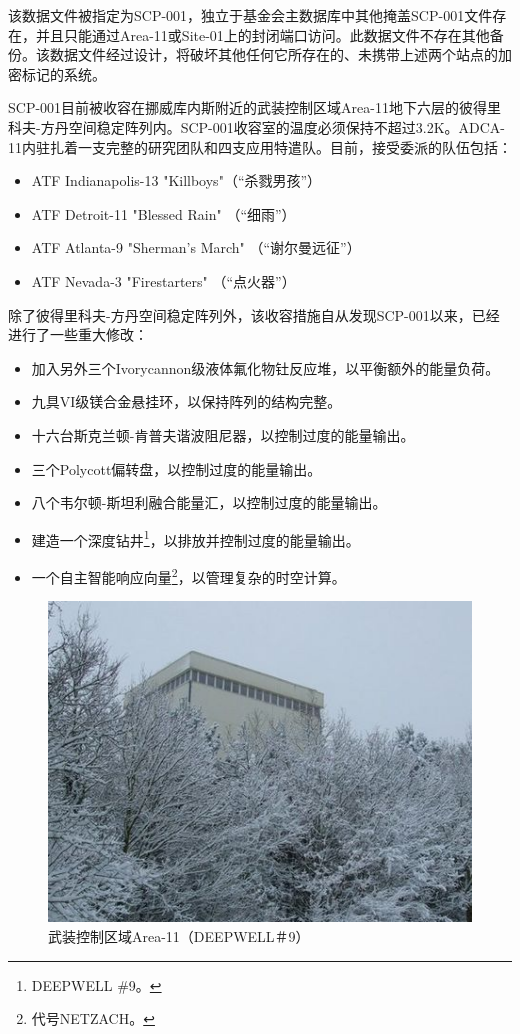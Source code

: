 \hr

该数据文件被指定为SCP-001，独立于基金会主数据库中其他掩盖SCP-001文件存在，并且只能通过Area-11或Site-01上的封闭端口访问。此数据文件不存在其他备份。该数据文件经过设计，将破坏其他任何它所存在的、未携带上述两个站点的加密标记的系统。

SCP-001目前被收容在挪威库内斯附近的武装控制区域Area-11地下六层的彼得里科夫-方丹空间稳定阵列内。SCP-001收容室的温度必须保持不超过3.2K。ADCA-11内驻扎着一支完整的研究团队和四支应用特遣队。目前，接受委派的队伍包括：

\begin{itemize}
\item ATF Indianapolis-13 "Killboys"（“杀戮男孩”）
\item ATF Detroit-11 "Blessed Rain" （“细雨”）
\item ATF Atlanta-9 "Sherman's March" （“谢尔曼远征”）
\item ATF Nevada-3 "Firestarters" （“点火器”）
\end{itemize}

除了彼得里科夫-方丹空间稳定阵列外，该收容措施自从发现SCP-001以来，已经进行了一些重大修改：

\begin{itemize}
\item 加入另外三个Ivorycannon级液体氟化物钍反应堆，以平衡额外的能量负荷。
\item 九具VI级镁合金悬挂环，以保持阵列的结构完整。
\item 十六台斯克兰顿-肯普夫谐波阻尼器，以控制过度的能量输出。
\item 三个Polycott偏转盘，以控制过度的能量输出。
\item 八个韦尔顿-斯坦利融合能量汇，以控制过度的能量输出。
\item 建造一个深度钻井\footnote{DEEPWELL \#9。}，以排放并控制过度的能量输出。
\item 一个自主智能响应向量\footnote{代号NETZACH。}，以管理复杂的时空计算。
\end{itemize}

\hr

\begin{figure}[H]
    \centering
    \includegraphics[width=0.5\linewidth]{images/SCP-001-atonement-4.jpg}
    \caption*{武装控制区域Area-11（DEEPWELL＃9）}
\end{figure}

